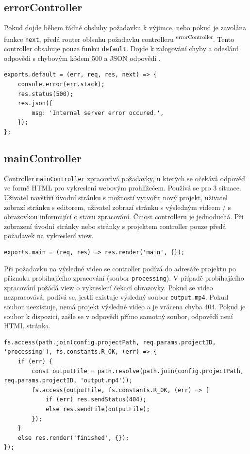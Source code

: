 \subsection{errorController}
Pokud dojde během řádné obsluhy požadavku k výjimce, nebo pokud je zavolána funkce \texttt{next}, předá router oblsuhu požadavku controlleru \textsuperscript{errorController}. Tento controller obsahuje pouze funkci \texttt{default}. Dojde k zalogování chyby a odeslání odpovědi s chybovým kódem 500 a JSON odpovědí .
\begin{lstlisting}[style=JavaScript]
exports.default = (err, req, res, next) => {
    console.error(err.stack);
    res.status(500);
    res.json({
        msg: 'Internal server error occured.',
    });
};
\end{lstlisting}

\subsection{mainController}
Controller \texttt{mainController} zpracovává požadavky, u kterých se očekává odpověď ve formě HTML pro vykreslení webovým prohlížečem. Používá se pro 3 situace. Uživatel navštíví úvodní stránku s možností vytvořit nový projekt, uživatel zobrazí stránku s editorem, uživatel zobrazí stránku s výsledným videem / s obrazovkou informující o stavu zpracování. Činost controlleru je jednoduchá. Při zobrazení úvodní stránky nebo stránky s projektem controller pouze předá požadavek na vykreslení view.
\begin{lstlisting}[style=JavaScript]
exports.main = (req, res) => res.render('main', {});
\end{lstlisting}

Při požadavku na výsledné video se controller podívá do adresáře projektu po příznaku probíhajícího zpracování (soubor \texttt{processing}). V případě probíhajícího zpracování požádá view o vykreslení čekací obrazovky. Pokud se video nezpracovává, podívá se, jestli existuje výsledný soubor \texttt{output.mp4}. Pokud soubor neexistuje, nemá projekt výsledné video a je vrácena chyba 404. Pokud je soubor k dispozici, zašle se v odpovědi přímo samotný soubor, odpovědí není HTML stránka.
\begin{lstlisting}[style=JavaScript]
fs.access(path.join(config.projectPath, req.params.projectID, 'processing'), fs.constants.R_OK, (err) => {
    if (err) {
        const outputFile = path.resolve(path.join(config.projectPath, req.params.projectID, 'output.mp4'));
        fs.access(outputFile, fs.constants.R_OK, (err) => {
            if (err) res.sendStatus(404);
            else res.sendFile(outputFile);
        });
    }
    else res.render('finished', {});
});
\end{lstlisting}

